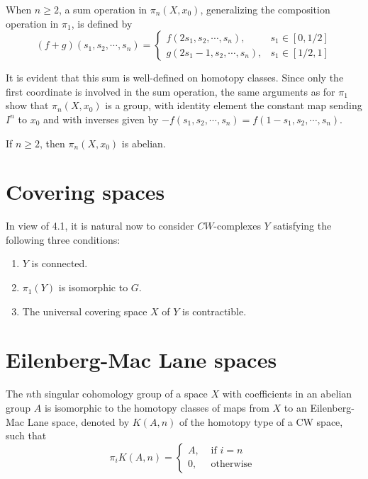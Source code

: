 When $n \geq 2$, a sum operation in $\pi_n\left(X, x_0\right)$, generalizing the composition operation in $\pi_1$, is defined by
$$
(f+g)\left(s_1, s_2, \cdots, s_n\right)= \begin{cases}f\left(2 s_1, s_2, \cdots, s_n\right), & s_1 \in[0,1 / 2] \\ g\left(2 s_1-1, s_2, \cdots, s_n\right), & s_1 \in[1 / 2,1]\end{cases}
$$

It is evident that this sum is well-defined on homotopy classes. Since only the first coordinate is involved in the sum operation, the same arguments as for $\pi_1$ show that $\pi_n\left(X, x_0\right)$ is a group, with identity element the constant map sending $I^n$ to $x_0$ and with inverses given by $-f\left(s_1, s_2, \cdots, s_n\right)=f\left(1-s_1, s_2, \cdots, s_n\right)$.


\begin{prop}
    If $n \geq 2$, then $\pi_n\left(X, x_0\right)$ is abelian.
\end{prop}


\section{Covering spaces}


In view of 4.1, it is natural now to consider $C W$-complexes $Y$ satisfying the following three conditions:
\begin{enumerate}
    \item $Y$ is connected.
    \item $\pi_1(Y)$ is isomorphic to $G$.
    \item The universal covering space $X$ of $Y$ is contractible.
\end{enumerate}



\section{Eilenberg-Mac Lane spaces}

The $n$th singular cohomology group of a space $X$ with coefficients in an abelian group $A$ is isomorphic to the homotopy classes of maps from $X$ to an Eilenberg-Mac Lane space, denoted by $K(A, n)$ of the homotopy type of a CW space, such that
$$
\pi_i K(A, n)= \begin{cases}A, & \text { if } i=n \\ 0, & \text { otherwise }\end{cases}
$$

